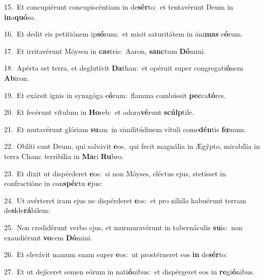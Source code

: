 {\numbfont\textcolor{\numbcolor}{15.}}~Et concupiérunt concupiscéntiam in de\-\textbf{sér}\-to:~\star et tentavérunt Deum in \textbf{in}\-a\-\textbf{quó}\-so.\par
{\numbfont\textcolor{\numbcolor}{16.}}~Et dedit eis petitiónem ip\-\textbf{só}\-rum:~\star et misit saturitátem in áni\textbf{mas} e\-\textbf{ó}\-rum.\par
{\numbfont\textcolor{\numbcolor}{17.}}~Et irritavérunt Móysen in \textbf{cas}\-tris:~\star Aaron, \textbf{sanc}\-tum \textbf{Dó}\-mini.\par
{\numbfont\textcolor{\numbcolor}{18.}}~Apérta est terra, et deglutívit \textbf{Da}\-than:~\star et opéruit super congregati\-\textbf{ó}\-nem \textbf{Ab}\-iron.\par
{\numbfont\textcolor{\numbcolor}{19.}}~Et exársit ignis in synagóga e\-\textbf{ó}\-rum:~\star flamma combússit \textbf{pec}\-ca\-\textbf{tó}\-res.\par
{\numbfont\textcolor{\numbcolor}{20.}}~Et fecérunt vítulum in \textbf{Ho}\-reb:~\star et adora\-\textbf{vé}\-runt \textbf{scúlp}\-tile.\par
{\numbfont\textcolor{\numbcolor}{21.}}~Et mutavérunt glóriam \textbf{su}\-am~\star in similitúdinem vítuli come\-\textbf{dén}\-tis \textbf{fœ}\-num.\par
{\numbfont\textcolor{\numbcolor}{22.}}~Oblíti sunt Deum, qui salvávit \textbf{e}\-os,~\star qui fecit magnália in Ægýpto, mirabília in terra Cham: terribília in \textbf{Ma}\-ri \textbf{Ru}\-bro.\par
{\numbfont\textcolor{\numbcolor}{23.}}~Et dixit ut dispérderet \textbf{e}\-os:~\star si non Móyses, eléctus ejus, stetísset in confractióne in con\-\textbf{spéc}\-tu \textbf{e}\-jus:\par
{\numbfont\textcolor{\numbcolor}{24.}}~Ut avérteret iram ejus ne dispérderet \textbf{e}\-os:~\star et pro níhilo habuérunt terram de\-\textbf{si}\-de\-\textbf{rá}\-bilem:\par
{\numbfont\textcolor{\numbcolor}{25.}}~Non credidérunt verbo ejus, et murmuravérunt in tabernáculis \textbf{su}\-is:~\star non exaudiérunt \textbf{vo}\-cem \textbf{Dó}\-mini.\par
{\numbfont\textcolor{\numbcolor}{26.}}~Et elevávit manum suam super \textbf{e}\-os:~\star ut prostérneret eos \textbf{in} de\-\textbf{sér}\-to:\par
{\numbfont\textcolor{\numbcolor}{27.}}~Et ut dejíceret semen eórum in nati\-\textbf{ó}\-nibus:~\star et dispérgeret eos in \textbf{re}\-gi\-\textbf{ó}\-nibus.\par
